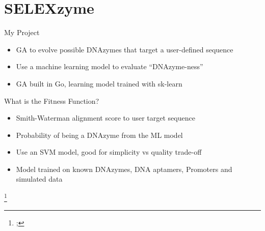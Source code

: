 \documentclass[aspectratio=43]{beamer}
\newcommand\blfootnote[1]{%
    \begingroup
    \renewcommand\thefootnote{}\footnote{#1}%
    \addtocounter{footnote}{-1}%
    \endgroup
}
\begin{document}
\section{SELEXzyme}
\begin{frame}[fragile]{My Project}
\begin{itemize}
    \item<2-> GA to evolve possible DNAzymes that target a user-defined sequence
    \item<3-> Use a machine learning model to evaluate “DNAzyme-ness”
    \item<4-> GA built in Go, learning model trained with sk-learn
\end{itemize}
\begin{figure}[htb!]
\end{figure}
\end{frame}
\begin{frame}[fragile]{What is the Fitness Function?}
    \begin{itemize}
        \item<2-> Smith-Waterman alignment score to user target sequence
        \item<3-> Probability of being a DNAzyme from the ML model
        \item<4-> Use an SVM model, good for simplicity vs quality trade-off
        \item<5-> Model trained on known DNAzymes, DNA aptamers, Promoters and simulated data
    \end{itemize}
    \begin{figure}[htb!]
    \end{figure}
    \blfootnote{\cite{svm_dna};\cite{svm_pic}}
\end{frame}
\end{document}
